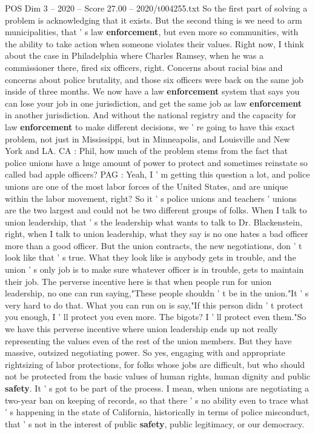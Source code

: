 \begin{textsample}{POS Dim 3 – 2020 – Score 27.00 – 2020/t004255.txt}
So the first part of solving a problem is acknowledging that it exists.
But the second thing is we need to arm municipalities, that ' s law \textbf{enforcement}, but even more so communities, with the ability to take action when someone violates their values.
Right now, I think about the case in Philadelphia where Charles Ramsey, when he was a commissioner there, fired six officers, right.
Concerns about racial bias and concerns about police brutality, and those six officers were back on the same job inside of three months.
We now have a law \textbf{enforcement} system that says you can lose your job in one jurisdiction, and get the same job as law \textbf{enforcement} in another jurisdiction.
And without the national registry and the capacity for law \textbf{enforcement} to make different decisions, we ' re going to have this exact problem, not just in Mississippi, but in Minneapolis, and Louisville and New York and LA.
CA : Phil, how much of the problem stems from the fact that police unions have a huge amount of power to protect and sometimes reinstate so called bad apple officers?
PAG : Yeah, I ' m getting this question a lot, and police unions are one of the most labor forces of the United States, and are unique within the labor movement, right?
So it ' s police unions and teachers ' unions are the two largest and could not be two different groups of folks.
When I talk to union leadership, that ' s the leadership what wants to talk to Dr.
Blackenstein, right, when I talk to union leadership, what they say is no one hates a bad officer more than a good officer.
But the union contracts, the new negotiations, don ' t look like that ' s true.
What they look like is anybody gets in trouble, and the union ' s only job is to make sure whatever officer is in trouble, gets to maintain their job.
The perverse incentive here is that when people run for union leadership, no one can run saying,"These people shouldn ' t be in the union."It ' s very hard to do that.
What you can run on is say,"If this person didn ' t protect you enough, I ' ll protect you even more.
The bigots?
I ' ll protect even them."So we have this perverse incentive where union leadership ends up not really representing the values even of the rest of the union members.
But they have massive, outsized negotiating power.
So yes, engaging with and appropriate rightsizing of labor protections, for folks whose jobs are difficult, but who should not be protected from the basic values of human rights, human dignity and public \textbf{safety}.
It ' s got to be part of the process.
I mean, when unions are negotiating a two-year ban on keeping of records, so that there ' s no ability even to trace what ' s happening in the state of California, historically in terms of police misconduct, that ' s not in the interest of public \textbf{safety}, public legitimacy, or our democracy.

\end{textsample}

